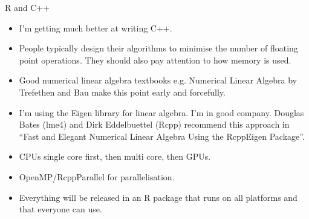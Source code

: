 \documentclass{beamer}
\begin{document}
\begin{frame}{R and C++}
\begin{itemize}
\item I'm getting much better at writing C++.
\item People typically design their algorithms to minimise the number of floating point operations. 
	  They should also pay attention to how memory is used.
\item Good numerical linear algebra textbooks
	  e.g. Numerical Linear Algebra by Trefethen and Bau make this point early and forcefully.
\item I'm using the Eigen library for linear algebra. I'm in good company. Douglas Bates (lme4) and
      Dirk Eddelbuettel (Rcpp) recommend this approach in ``Fast and Elegant Numerical Linear Algebra Using the RcppEigen Package''.
\item CPUs single core first, then multi core, then GPUs.
\item OpenMP/RcppParallel for parallelisation.
\item Everything will be released in an R package that runs on all platforms and that everyone can 		  use.
\end{itemize}
\end{frame}
\end{document}
